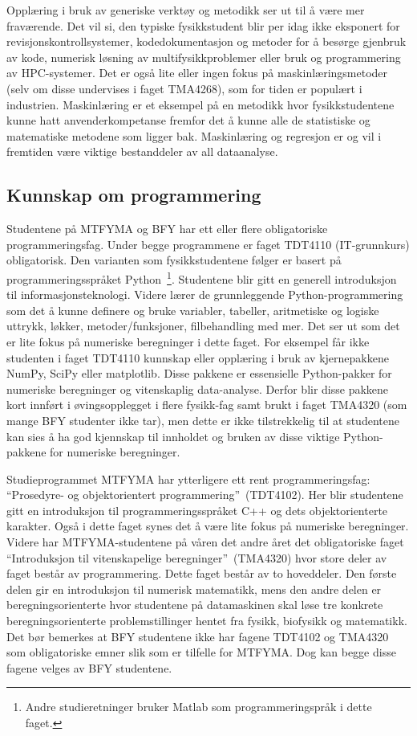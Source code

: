 \documentclass{article}
\begin{document}
Opplæring i bruk av generiske verktøy og metodikk ser ut til å være mer fraværende. Det vil si, den typiske fysikkstudent blir per idag ikke eksponert for revisjonskontrollsystemer, kodedokumentasjon og metoder for å besørge gjenbruk av kode, numerisk løsning av multifysikkproblemer eller bruk og programmering av HPC-systemer. Det er også lite eller ingen fokus på maskinlæringsmetoder (selv om disse undervises i faget TMA4268), som for tiden er populært i industrien. Maskinlæring er et eksempel på en metodikk hvor fysikkstudentene kunne hatt anvenderkompetanse fremfor det å kunne alle de statistiske og matematiske metodene som ligger bak. Maskinlæring og regresjon er og vil i fremtiden være viktige bestanddeler av all dataanalyse.  

\subsection{Kunnskap om programmering}
\label{Sec:Programming}
Studentene på MTFYMA og BFY har ett eller flere obligatoriske programmeringsfag. Under begge programmene er faget TDT4110 (IT-grunnkurs) obligatorisk. Den varianten som fysikkstudentene følger er basert på programmeringsspråket Python~\footnote{Andre studieretninger bruker Matlab som programmeringspråk i dette faget.}. Studentene blir gitt en generell introduksjon til informasjonsteknologi. Videre lærer de grunnleggende Python-programmering som det å kunne definere og bruke variabler, tabeller, aritmetiske og logiske uttrykk, løkker, metoder/funksjoner, filbehandling med mer. Det ser ut som det er lite fokus på numeriske beregninger i dette faget. For eksempel får ikke studenten i faget TDT4110 kunnskap eller opplæring i bruk av kjernepakkene NumPy, SciPy eller matplotlib. Disse pakkene er essensielle Python-pakker for numeriske beregninger og vitenskaplig data-analyse. Derfor blir disse pakkene kort innført i øvingsopplegget i flere fysikk-fag samt brukt i faget TMA4320 (som mange BFY studenter ikke tar), men dette er ikke tilstrekkelig til at studentene kan sies å ha god kjennskap til innholdet og bruken av disse viktige Python-pakkene for numeriske beregninger. 

Studieprogrammet MTFYMA har ytterligere ett rent programmeringsfag: ``Prosedyre- og objektorientert programmering''~(TDT4102). Her blir studentene gitt en introduksjon til programmeringsspråket C++ og dets objektorienterte karakter. Også i dette faget synes det å være lite fokus på numeriske beregninger. Videre har MTFYMA-studentene på våren det andre året det obligatoriske faget ``Introduksjon til vitenskapelige beregninger''~(TMA4320) hvor store deler av faget består av programmering. Dette faget består av to hoveddeler. Den første delen gir en introduksjon til numerisk matematikk, mens den andre delen er beregningsorienterte hvor studentene på datamaskinen skal løse tre konkrete beregningsorienterte problemstillinger hentet fra fysikk, biofysikk og matematikk. Det bør bemerkes at BFY studentene ikke har fagene TDT4102 og TMA4320 som obligatoriske emner slik som er tilfelle for MTFYMA. Dog kan begge disse fagene velges av BFY studentene.
\end{document}
